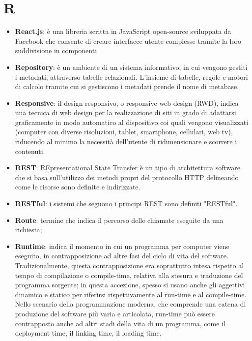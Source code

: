 \section{R}
\begin{itemize}
\item
\textbf{React.js}: è una libreria scritta in JavaScript open-source sviluppata da Facebook che consente di creare interfacce utente complesse tramite la loro suddivisione in componenti
\item
\textbf{Repository}: è un ambiente di un sistema informativo, in cui vengono gestiti i metadati, attraverso tabelle relazionali. L'insieme di tabelle, regole e motori di calcolo tramite cui si gestiscono i metadati prende il nome di metabase.
\item
\textbf{Responsive}: il design responsivo, o responsive web design (RWD), indica una tecnica di web design per la realizzazione di siti in grado di adattarsi graficamente in modo automatico al dispositivo coi quali vengono visualizzati (computer con diverse risoluzioni, tablet, smartphone, cellulari, web tv), riducendo al minimo la necessità dell'utente di ridimensionare e scorrere i contenuti. 
\item
\textbf{REST}: REpresentational State Transfer è un tipo di architettura software che si basa sull'utilizzo dei metodi propri del protocollo HTTP delineando come le risorse sono definite e indirizzate.
\item
\textbf{RESTful}: i sistemi che seguono i principi REST sono definiti "RESTful".
\item
\textbf{Route}: termine che indica il percorso delle chiamate eseguite da una richiesta;
\item
\textbf{Runtime}: indica il momento in cui un programma per computer viene eseguito, in contrapposizione ad altre fasi del ciclo di vita del software.
Tradizionalmente, questa contrapposizione era soprattutto intesa rispetto al tempo di compilazione o compile-time, relativa alla stesura e traduzione del programma sorgente; in questa accezione, spesso si usano anche gli aggettivi dinamico e statico per riferirsi rispettivamente al run-time e al compile-time. Nello scenario della programmazione moderna, che comprende una catena di produzione del software più varia e articolata, run-time può essere contrapposto anche ad altri stadi della vita di un programma, come il deployment time, il linking time, il loading time.
\end{itemize}